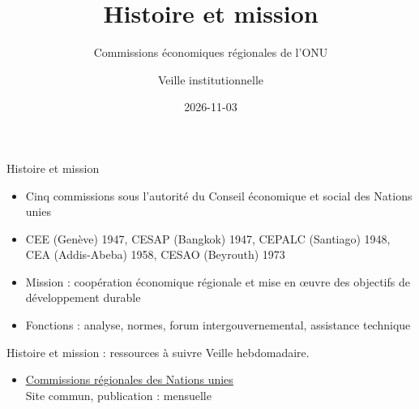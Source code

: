 \documentclass[aspectratio=169,11pt]{beamer}
\title{Histoire et mission}
\subtitle{Commissions économiques régionales de l'ONU}
\author{Veille institutionnelle}
\date{2026-11-03}
\begin{document}
\begin{frame}\titlepage\end{frame}

\begin{frame}{Histoire et mission}
\begin{itemize}
\item Cinq commissions sous l'autorité du Conseil économique et social des Nations unies
\item CEE (Genève) 1947, CESAP (Bangkok) 1947, CEPALC (Santiago) 1948, CEA (Addis-Abeba) 1958, CESAO (Beyrouth) 1973
\item Mission : coopération économique régionale et mise en œuvre des objectifs de développement durable
\item Fonctions : analyse, normes, forum intergouvernemental, assistance technique
\end{itemize}
\end{frame}

\begin{frame}{Histoire et mission : ressources à suivre}
\small
Veille hebdomadaire.
\begin{itemize}
\item \href{https://www.regionalcommissions.org}{Commissions régionales des Nations unies}\\{\footnotesize Site commun, publication : mensuelle}
\end{itemize}
\end{frame}
\end{document}
